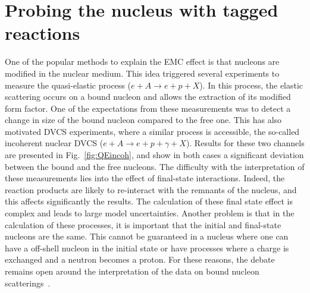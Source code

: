 \section{Probing the nucleus with tagged reactions} 

One of the popular methods to explain the EMC effect is that nucleons
are modified in the nuclear medium. This idea
triggered several experiments to measure the quasi-elastic 
process ($e+A \rightarrow e+p+X$). In this process, the 
elastic scattering occurs on a bound nucleon and allows the extraction of its modified 
form factor. One of the expectations from these measurements was to detect a change
in size of the bound nucleon compared to the free one. This has also motivated 
DVCS experiments, where a similar process is accessible, the so-called
incoherent nuclear DVCS ($e+A \rightarrow e+p+\gamma+X$). Results for these two 
channels are presented in Fig.~\ref{fig:QEincoh}, and show in both cases a 
significant deviation between the bound and the free nucleons. 
The difficulty with the interpretation of these measurements lies into the 
effect of final-state interactions. Indeed, the reaction products are likely
to re-interact with the remnants of the nucleus, and this affects significantly the
results. The calculation of these final state effect is complex and leads to large model 
uncertainties. 
Another problem is that in the calculation of these processes, it is important
that the initial and final-state nucleons are the same. This cannot be guaranteed
in a nucleus where one can have a off-shell nucleon in the initial state or 
have processes where a charge is exchanged and a neutron becomes a proton. For
these reasons, the debate remains open around 
the interpretation of the data on bound nucleon scatterings~\cite{Benhar:2006wy}.

